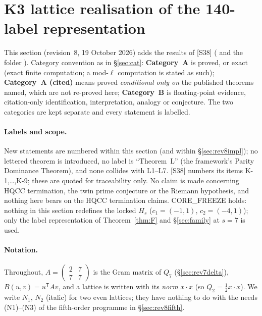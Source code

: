 \section{K3 lattice realisation of the 140-label representation}\label{sec:rev8k3}
This section (revision~8, 19 October 2026) adds the results of [S38] ( and the folder ). Category convention as in \S\ref{sec:cat}: \textbf{Category~A} is proved, or exact (exact finite computation; a mod-$\ell$ computation is stated as such); \textbf{Category~A (cited)} means proved \emph{conditional only on} the published theorems named, which are not re-proved here; \textbf{Category~B} is floating-point evidence, citation-only identification, interpretation, analogy or conjecture. The two categories are kept separate and every statement is labelled.

\paragraph{Labels and scope.} New statements are numbered within this section (and within \S\ref{sec:rev8impl}); no lettered theorem is introduced, no label is ``Theorem~L'' (the framework's Parity Dominance Theorem), and none collides with L1--L7. [S38] numbers its items K-1,\dots,K-9; these are quoted for traceability only. No claim is made concerning HQCC termination, the twin prime conjecture or the Riemann hypothesis, and nothing here bears on the HQCC termination claims. CORE\_FREEZE holds: nothing in this section redefines the locked $H_s$ ($c_1=(-1,1)$, $c_2=(-4,1)$); only the label representation of Theorem~\ref{thm:F} and \S\ref{sec:family} at $s=7$ is used.

\paragraph{Notation.} Throughout, $A=\left(\begin{smallmatrix}2&7\\7&7\end{smallmatrix}\right)$ is the Gram matrix of $Q_7$ (\S\ref{sec:rev7delta}), $B(u,v)=u^{\mathsf T}Av$, and a lattice is written with its \emph{norm} $x\cdot x$ (so $Q_2=\tfrac12x\cdot x$). We write $N_1$, $N_2$ (italic) for two even lattices; they have nothing to do with the needs \textsf{(N1)}--\textsf{(N3)} of the fifth-order programme in \S\ref{sec:rev8fifth}.

